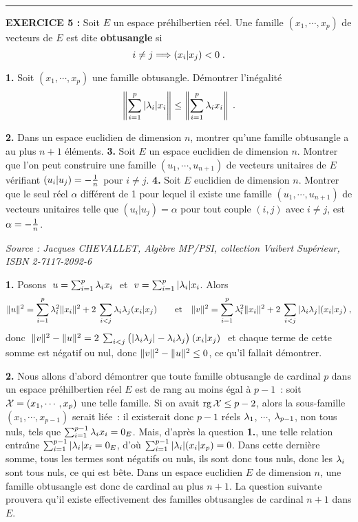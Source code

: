 \documentclass{article}
\begin{document}
\bsk
\hrule
\bsk

{\bf EXERCICE 5 :}\msk
Soit $E$ un espace pr\'ehilbertien r\'eel. Une famille $(x_1,\cdots,x_p)$ de vecteurs de $E$ est dite {\bf obtusangle} si\vv
$$i\not=j\Longrightarrow (x_i|x_j)<0\;.$$\par
{\bf 1.} Soit $(x_1,\cdots,x_p)$ une famille obtusangle. D\'emontrer l'in\'egalit\'e\vv
$$\left\|\sum_{i=1}^p|\lambda_i|x_i\right\|\leq\left\|\sum_{i=1}^p\lambda_ix_i\right\|\;.$$\par
{\bf 2.} Dans un espace euclidien de dimension $n$, montrer qu'une famille obtusangle a au plus $n+1$ \'el\'ements.\msk
{\bf 3.} Soit $E$ un espace euclidien de dimension $n$. Montrer que l'on peut construire une famille $(u_1,\cdots,u_{n+1})$ de vecteurs unitaires de $E$ v\'erifiant $(u_i|u_j)=-{1\over n}$ pour $i\not=j$.
\msk
{\bf 4.} Soit $E$ euclidien de dimension $n$. Montrer que le seul r\'eel $\alpha$ diff\'erent de 1 pour lequel il existe une famille $(u_1,\cdots,u_{n+1})$ de vecteurs unitaires telle que $(u_i|u_j)=\alpha$ pour tout couple $(i,j)$ avec $i\not=j$, est $\alpha=-{1\over n}$.

\msk

{\it Source : Jacques CHEVALLET, Alg\`ebre MP/PSI, collection Vuibert Sup\'erieur, ISBN 2-7117-2092-6}

\bsk
\cl{- - - - - - - - - - - - - - - - - - - - - - - - - - - - - - - - -}
\bsk

{\bf 1.} Posons $\;u=\sum_{i=1}^p\lambda_ix_i\;$ et $\;v=\sum_{i=1}^p|\lambda_i|x_i$. Alors\vv
$$\|u\|^2=\sum_{i=1}^p\lambda_i^2\|x_i\|^2+2\>\sum_{i<j}\lambda_i\lambda_j(x_i|x_j)\qquad{\rm et}\quad
\|v\|^2=\sum_{i=1}^p\lambda_i^2\|x_i\|^2+2\>\sum_{i<j}|\lambda_i\lambda_j|(x_i|x_j)\;,$$
donc $\;\|v\|^2-\|u\|^2=2\>\sum_{i<j}\big(|\lambda_i\lambda_j|-\lambda_i\lambda_j\big)\>(x_i|x_j)\;$ et chaque terme de cette somme est n\'egatif ou nul, donc $\|v\|^2-\|u\|^2\leq0$, ce qu'il fallait d\'emontrer.

\msk
{\bf 2.} Nous allons d'abord d\'emontrer que toute famille obtusangle de cardinal $p$ dans un espace pr\'ehilbertien r\'eel $E$ est de rang au moins \'egal \`a $p-1$~: soit ${\cal X}=(x_1,\cdots,x_p)$ une telle famille. Si on avait $\mathop{\rm rg}\nolimits{\cal X}\leq p-2$, alors la sous-famille $(x_1,\cdots,x_{p-1})$ serait li\'ee~: il existerait donc $p-1$ r\'eels $\lambda_1$, $\cdots$, $\lambda_{p-1}$, non tous nuls, tels que $\sum_{i=1}^{p-1}\lambda_ix_i=0_E$. Mais, d'apr\`es la question {\bf 1.}, une telle relation entra\^\i ne $\sum_{i=1}^{p-1}|\lambda_i|x_i=0_E$, d'o\`u $\sum_{i=1}^{p-1}|\lambda_i| (x_i|x_p)=0$. Dans cette derni\`ere somme, tous les termes sont n\'egatifs ou nuls, ils sont donc tous nuls, donc les $\lambda_i$ sont tous nuls, ce qui est b\^ete.
\ssk\sect
Dans un espace euclidien $E$ de dimension $n$, une famille obtusangle est donc de cardinal au plus $n+1$. La question suivante prouvera qu'il existe effectivement des familles obtusangles de cardinal $n+1$ dans $E$.
\end{document}
